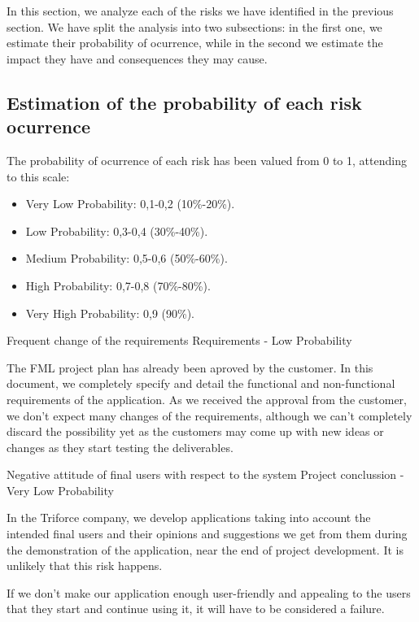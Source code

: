 
In this section, we analyze each of the risks we have identified in the previous section. We have split the analysis into two subsections: in the first one, we estimate their probability of ocurrence, while in the second we estimate the impact they have and consequences they may cause.

\subsection{Estimation of the probability of each risk ocurrence}
The probability of ocurrence of each risk has been valued from 0 to 1, attending to this scale:
\begin{itemize}
\item Very Low Probability: 0,1-0,2 (10\%-20\%).
\item Low Probability: 0,3-0,4 (30\%-40\%).
\item Medium Probability: 0,5-0,6 (50\%-60\%).
\item High Probability: 0,7-0,8 (70\%-80\%).
\item Very High Probability: 0,9 (90\%).
\end{itemize}


\begin{risk}{Frequent change of the requirements}
\riskcat Requirements
 - Low Probability 

The FML project plan has already been aproved by the customer. In this document, we completely specify and detail the functional and non-functional requirements of the application. As we received the approval from the customer, we don't expect many changes of the requirements, although we can't completely discard the possibility yet as the customers may come up with new ideas or changes as they start testing the deliverables.
\end{risk}

\begin{risk}{Negative attitude of final users with respect to the system}
\riskcat Project conclussion
 - Very Low Probability 

In the Triforce company, we develop applications taking into account the intended final users and their opinions and suggestions we get from them during the demonstration of the application, near the end of project development. It is unlikely that this risk happens. 

If we don't make our application enough user-friendly and appealing to the users that they start and continue using it, it will have to be considered a failure. 
\end{risk}

